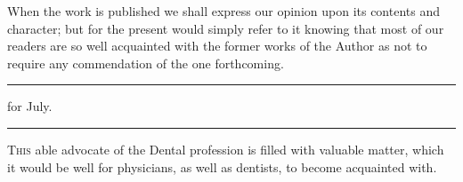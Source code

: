 When the work is published we shall express our opinion upon its
contents and character; but for the present would simply refer to it
knowing that most of our readers are so well acquainted with the former
works of the Author as not to require any commendation of the one
forthcoming.

\fancybreak{* * *}

 for July.
\plainbreak{1}
\normalsize

\lettrine[lines=1]{}{This} able advocate of the Dental profession is filled with valuable
matter, which it would be well for physicians, as well as dentists, to
become acquainted with.\endinput
